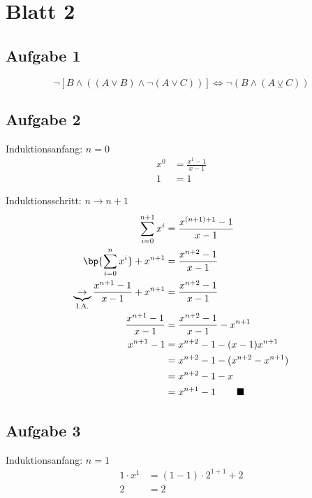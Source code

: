 \section*{Blatt 2}

	\subsection*{Aufgabe 1}

	\begin{equation}
		\lnot \left[B \land ((A \lor B) \land \lnot(A \lor C))\right] \iff \lnot (B \land (A \veebar C))
	\end{equation}

	\subsection*{Aufgabe 2}

	Induktionsanfang: $n=0$ \\
	\begin{align}
		x^{0} &= \frac{x^1 - 1}{x - 1} \\
		1 &= 1
	\end{align}

	Induktionsschritt: $n \to n+1$ \\

	\begin{align}
		\sum_{i=0}^{n+1} x^{i} &= \frac{x^{(n+1)+1} -1}{x-1} \\
		\bp{\sum_{i=0}^{n} x^{i}} + x^{n+1} &= \frac{x^{n+2} - 1}{x-1} \\
		\underbrace{\to}_{\text{I.A.}} \frac{x^{n+1} - 1}{x-1} + x^{n+1} &= \frac{x^{n+2}-1}{x-1} \\
		\frac{x^{n+1} - 1}{x-1} &= \frac{x^{n+2} -1}{x-1} - x^{n+1} \\
		x^{n+1} - 1 &= x^{n+2} - 1 - (x-1)x^{n+1} \\
						 		&= x^{n+2} - 1 - (x^{n+2} - x^{n+1}) \\
						 		&= x^{n+2} - 1 - x \\
						 		&= x^{n+1} - 1  \hspace{5ex} \blacksquare
	\end{align}

	\subsection*{Aufgabe 3}

	Induktionsanfang: $n=1$ \\
	\begin{align}
		1 \cdot x^1 &= (1-1) \cdot 2^{1+1} + 2 \\
		2 &= 2
	\end{align}

